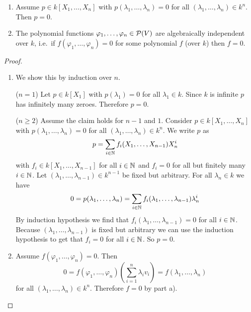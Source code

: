 \begin{lemma}
  \begin{enumerate}[label=\emph{\alph*)},leftmargin=*]
    \item
      Assume $p \in k[X_1, \dotsc, X_n]$ with $p(\lambda_1, \dotsc, \lambda_n) = 0$ for all $(\lambda_1,\dotsc,\lambda_n) \in k^n$.
      Then $p = 0$.
    \item
      The polynomial functions $\varphi_1, \dotsc, \varphi_n \in \mathcal{P}(V)$ are algebraically independent over $k$, i.e.\ if $f(\varphi_1, \dotsc, \varphi_n) = 0$ for some polynomial $f$ (over $k$) then $f = 0$.
  \end{enumerate}
\end{lemma}
\begin{proof}
  \begin{enumerate}[label=\emph{\alph*)},leftmargin=*]
    \item
      We show this by induction over $n$.
      
      ($n = 1$)
      Let $p \in k[X_1]$ with $p(\lambda_1) = 0$ for all $\lambda_1 \in k$.
      Since $k$ is infinite $p$ has infinitely many zeroes.
      Therefore $p = 0$.
      
      ($n \geq 2$)
      Assume the claim holds for $n-1$ and $1$.
      Consider $p \in k[X_1, \dotsc, X_n]$ with $p(\lambda_1, \dotsc, \lambda_n) = 0$ for all $(\lambda_1, \dotsc, \lambda_n) \in k^n$.
      We write $p$ as
      \[
          p
        = \sum_{i \in \mathbb{N}} f_i(X_1, \dotsc, X_{n-1}) X_n^i
      \]
      with $f_i \in k[X_1, \dotsc, X_{n-1}]$ for all $i \in \mathbb{N}$ and $f_i = 0$ for all but finitely many $i \in \mathbb{N}$.
      Let $(\lambda_1, \dotsc, \lambda_{n-1}) \in k^{n-1}$ be fixed but arbitrary.
      For all $\lambda_n \in k$ we have
      \[
          0
        = p(\lambda_1, \dotsc, \lambda_n)
        = \sum_{i \in \mathbb{N}} f_i(\lambda_1, \dotsc, \lambda_{n-1}) \lambda_n^i
      \]
      By induction hypothesis we find that $f_i(\lambda_1, \dotsc, \lambda_{n-1}) = 0$ for all $i \in \mathbb{N}$.
      Because $(\lambda_1, \dotsc, \lambda_{n-1})$ is fixed but arbitrary we can use the induction hypothesis to get that $f_i = 0$ for all $i \in \mathbb{N}$.
      So $p = 0$.
    \item
      Assume $f(\varphi_1, \dotsc, \varphi_n) = 0$. Then
      \[
          0
        = f(\varphi_1, \dotsc, \varphi_n)\left(\sum_{i=1}^n \lambda_i v_i\right)
        = f(\lambda_1, \dotsc, \lambda_n)
      \]
      for all $(\lambda_1, \dotsc, \lambda_n) \in k^n$.
      Therefore $f = 0$ by part a).
    \qedhere
  \end{enumerate}
\end{proof}


